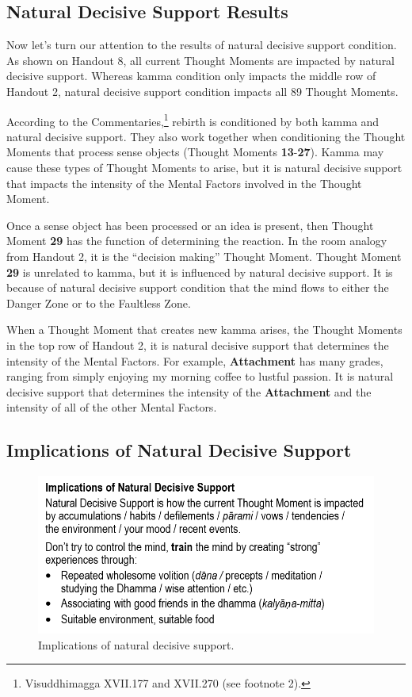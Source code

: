 \subsection*{Natural Decisive Support Results}

Now let’s turn our attention to the results of natural decisive support condition. As shown on Handout 8, all current Thought Moments are impacted by natural decisive support. Whereas kamma condition only impacts the middle row of Handout 2, natural decisive support condition impacts all 89 Thought Moments.

According to the Commentaries,\footnote{Visuddhimagga XVII.177 and XVII.270 (see footnote 2).} rebirth is conditioned by both kamma and natural decisive support. They also work together when conditioning the Thought Moments that process sense objects (Thought Moments \textbf{13}-\textbf{27}). Kamma may cause these types of Thought Moments to arise, but it is natural decisive support that impacts the intensity of the Mental Factors involved in the Thought Moment.

Once a sense object has been processed or an idea is present, then Thought Moment \textbf{29} has the function of determining the reaction. In the room analogy from Handout 2, it is the “decision making” Thought Moment. Thought Moment \textbf{29} is unrelated to kamma, but it is influenced by natural decisive support. It is because of natural decisive support condition that the mind flows to either the Danger Zone or to the Faultless Zone.

When a Thought Moment that creates new kamma arises, the Thought Moments in the top row of Handout 2, it is natural decisive support that determines the intensity of the Mental Factors. For example, \textbf{Attachment} has many grades, ranging from simply enjoying my morning coffee to lustful passion. It is natural decisive support that determines the intensity of the \textbf{Attachment} and the intensity of all of the other Mental Factors.

\subsection*{Implications of Natural Decisive Support}

\begin{figure}[h]
\centering
\includegraphics[width=0.7\linewidth]{./Diagrams/Implications}
\caption{Implications of natural decisive support.}
\label{fig:Implications}
\end{figure}

